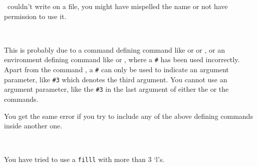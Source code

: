 \begin{plainlist}
  \tx\ couldn't write on a file, you might have mispelled the name
   or not have permission to use it.





\item[\textmess{!}] 
     \\

    This is probably due to a command defining command like \cmd{\newcommand}
 or \cmd{\renewcommand} or \cmd{\providecommand}, or an environment
 defining command like \cmd{\newenvironment} or \cmd{\renewenvironment}, where 
a \verb?#? has been used incorrectly. Apart from the command \cmd{\#},
a \verb?#? can only be used to indicate an argument parameter, like \verb?#3?
which denotes the third argument. You cannot use an argument parameter,
like the \verb?#3? in the last argument of either the \cmd{\newenvironment}
or the \cmd{\renewenvironment} commands.

    You get the same error if you try to include any of the above defining
commands inside another one.


\item[\textmess{!}]
     \\

    You have tried to use a \texttt{filll} with more than 3 `l's.


\end{plainlist}
